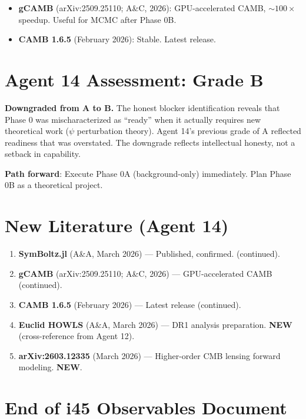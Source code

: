 \documentclass[11pt,a4paper]{article}
\newcommand{\NEW}{\textcolor{dfdblue}{\textbf{NEW}}}
\begin{document}
\begin{itemize}
\item \textbf{gCAMB} (arXiv:2509.25110; A\&C, 2026): GPU-accelerated CAMB, $\sim 100\times$ speedup. Useful for MCMC after Phase 0B.
\item \textbf{CAMB 1.6.5} (February 2026): Stable. Latest release.
\end{itemize}

\section{Agent 14 Assessment: Grade B}

\textbf{Downgraded from A to B.} The honest blocker identification reveals that Phase 0 was mischaracterized as ``ready'' when it actually requires new theoretical work ($\psi$ perturbation theory). Agent 14's previous grade of A reflected readiness that was overstated. The downgrade reflects intellectual honesty, not a setback in capability.

\textbf{Path forward}: Execute Phase 0A (background-only) immediately. Plan Phase 0B as a theoretical project.

\section{New Literature (Agent 14)}

\begin{enumerate}
\item \textbf{SymBoltz.jl} (A\&A, March 2026) --- Published, confirmed. (continued).
\item \textbf{gCAMB} (arXiv:2509.25110; A\&C, 2026) --- GPU-accelerated CAMB (continued).
\item \textbf{CAMB 1.6.5} (February 2026) --- Latest release (continued).
\item \textbf{Euclid HOWLS} (A\&A, March 2026) --- DR1 analysis preparation. \NEW{} (cross-reference from Agent 12).
\item \textbf{arXiv:2603.12335} (March 2026) --- Higher-order CMB lensing forward modeling. \NEW.
\end{enumerate}


\section*{End of i45 Observables Document}
\end{document}
